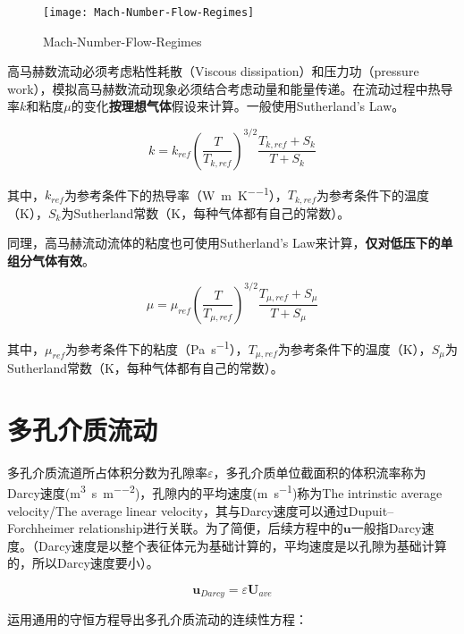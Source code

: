 \begin{figure}[h]
    \centering
    \texttt{[image: Mach-Number-Flow-Regimes]}
    \caption{Mach-Number-Flow-Regimes}
\end{figure}

高马赫数流动必须考虑粘性耗散（Viscous dissipation）和压力功（pressure work），模拟高马赫数流动现象必须结合考虑动量和能量传递。在流动过程中热导率$ k $和粘度$ \mu $的变化\textbf{按理想气体}假设来计算。一般使用Sutherland's Law。

\begin{equation}
k = k_{ref}\left( \frac{T}{T_{k,ref}} \right)^{3/2}\frac{T_{k,ref}+S_k}{T+S_k}
\end{equation}

其中，$ k_{ref} $为参考条件下的热导率（\si{\watt\per\meter\per\kelvin}），$ T_{k,ref} $为参考条件下的温度（\si{\kelvin}），$ S_k $为Sutherland常数（\si{\kelvin}，每种气体都有自己的常数）。

同理，高马赫流动流体的粘度也可使用Sutherland's Law来计算，\textbf{仅对低压下的单组分气体有效}。

\begin{equation}
\mu = \mu_{ref}\left( \frac{T}{T_{\mu,ref}} \right)^{3/2}\frac{T_{\mu,ref}+S_\mu}{T+S_\mu}
\end{equation}

其中，$ \mu_{ref} $为参考条件下的粘度（\si{\pascal\per\second}），$ T_{\mu,ref} $为参考条件下的温度（\si{\kelvin}），$ S_\mu $为Sutherland常数（\si{\kelvin}，每种气体都有自己的常数）。

\section{多孔介质流动}

多孔介质流道所占体积分数为孔隙率$ \varepsilon $，多孔介质单位截面积的体积流率称为Darcy速度(\si{\meter\cubed\per\second\per\square\meter})，孔隙内的平均速度(\si{\meter\per\second})称为The intrinstic average velocity/The average linear velocity，其与Darcy速度可以通过Dupuit–Forchheimer relationship进行关联。为了简便，后续方程中的$ \bm{u} $一般指Darcy速度。（Darcy速度是以整个表征体元为基础计算的，平均速度是以孔隙为基础计算的，所以Darcy速度要小）。

\begin{equation}\label{Dupuit–Forchheimer-relationship}
\bm{u}_{Darcy} = \varepsilon \bm{U}_{ave}
\end{equation}

运用通用的守恒方程导出多孔介质流动的连续性方程：


